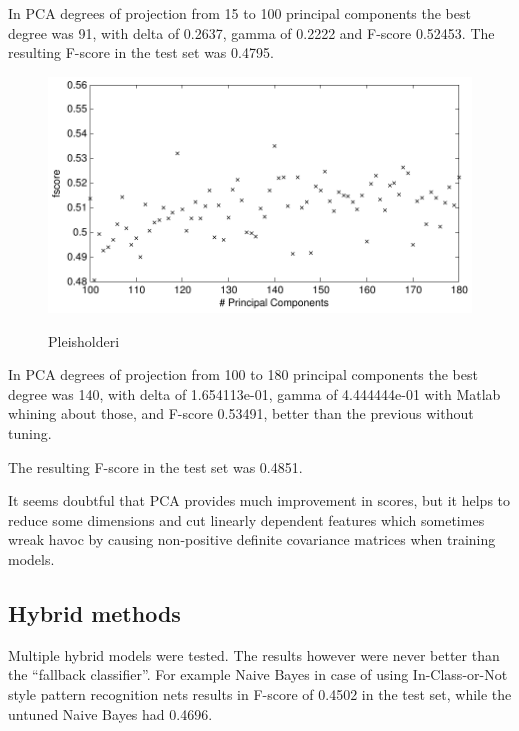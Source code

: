 \documentclass[a4paper,10pt]{article}
\begin{document}
In PCA degrees of projection from 15 to 100 principal components the best degree was 91, with delta of 0.2637, gamma of 0.2222 and F-score 0.52453. The resulting F-score in the test set was 0.4795.

\begin{figure}
\begin{center}
	\caption{Pleisholderi}
	{\includegraphics[scale=0.5,angle=0]{./img/bayes_gamma_pca2.pdf}}
	\label{fig:BayesGamma21}
\end{center}
\end{figure}

In PCA degrees of projection from 100 to 180 principal components the best degree was 140, with delta of 1.654113e-01, gamma of 4.444444e-01 with Matlab whining about those, and F-score 0.53491, better than the previous without tuning.

The resulting F-score in the test set was 0.4851.

It seems doubtful that PCA provides much improvement in scores, but it helps to reduce some dimensions and cut linearly dependent features which sometimes wreak havoc by causing non-positive definite covariance matrices when training models.

\subsection{Hybrid methods}

Multiple hybrid models were tested. The results however were never better than the “fallback classifier”. For example Naive Bayes in case of using In-Class-or-Not style pattern recognition nets results in F-score of 0.4502 in the test set, while the untuned Naive Bayes had 0.4696. 
\end{document}
